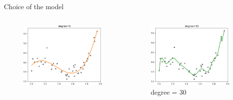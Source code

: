 \documentclass[handout, 10pt]{beamer}
\begin{document}
\begin{frame}{Choice of the model}
\begin{columns}
\begin{figure}
    \includegraphics[width=\textwidth]{interp-pol-3.png}
    \end{figure}
\pause
    \begin{figure}
    \caption*{degree = 30 }
    \includegraphics[width=\textwidth]{interp-pol-30.png}
    \end{figure}
 
\end{columns}
   
\end{frame}
\end{document}
